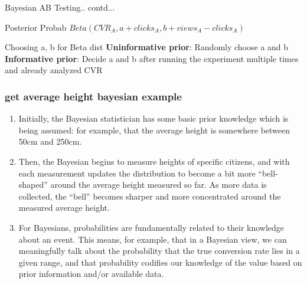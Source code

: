 \documentclass{beamer}
\begin{document}
\begin{frame}{Bayesian AB Testing.. contd...}
	\begin{block}{Posterior Probab}
		$Beta(CVR_A, a+clicks_A, b+views_A-clicks_A)$
	\end{block}

	\begin{alertblock}{Choosing a, b for Beta dist}
		\textbf{Uninformative prior}: Randomly choose a and b\\
		\textbf{Informative prior}: Decide a and b after running the experiment multiple times and already analyzed CVR
	\end{alertblock}
\end{frame}


\begin{frame}[allowframebreaks]\frametitle{get average height bayesian example}
	\begin{enumerate}
		\item 	Initially, the Bayesian statistician has some basic prior knowledge which is being assumed: for example, that the average height is somewhere between 50cm and 250cm.
		\item Then, the Bayesian begins to measure heights of specific citizens, and with each measurement updates the distribution to become a bit more “bell-shaped” around the average height measured so far. As more data is collected, the “bell” becomes sharper and more concentrated around the measured average height.
		\item For Bayesians, probabilities are fundamentally related to their knowledge about an event. This means, for example, that in a Bayesian view, we can meaningfully talk about the probability that the true conversion rate lies in a given range, and that probability codifies our knowledge of the value based on prior information and/or available data.
	\end{enumerate}
\begin{tabular}{c|c}
	

\end{tabular}
\end{frame}
\end{document}
